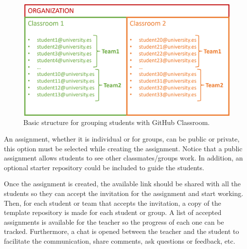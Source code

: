 \begin{figure}[h]
    \centering
    \includegraphics[width = \textwidth]{Figures/OrgGHClass.png}
    \caption{Basic structure for grouping students with GitHub Classroom.}
    \label{fig:OrgGHClass}
\end{figure} 


An assignment, whether it is individual or for groups, can be public or private, this option must be selected while creating the assignment. 
Notice that a public assignment allows students to see other classmates/groups work. 
In addition, an optional starter repository could be included to guide the students. 

Once the assignment is created, the available link should be shared with all the students so they can accept the invitation for the assignment and start working.  
Then, for each student or team that accepts the invitation, a copy of the template repository is made for each student or group. 
A list of accepted assignments is available for the teacher so the progress of each one can be tracked. Furthermore, a chat is opened between the teacher and the student 
to facilitate the communication, share comments, ask questions or feedback, etc. 















